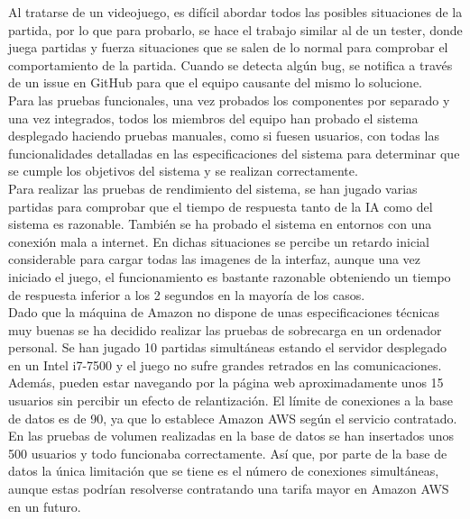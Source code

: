 Al tratarse de un videojuego, es difícil abordar todos las posibles situaciones de la partida, por lo que para probarlo, se hace el trabajo similar al de un tester, donde juega partidas y fuerza situaciones que se salen de lo normal para comprobar el comportamiento de la partida. Cuando se detecta algún bug, se notifica a través de un issue en GitHub para que el equipo causante del mismo lo solucione. \\

Para las pruebas funcionales, una vez probados los componentes por separado y una vez integrados, todos los miembros del equipo han probado el sistema desplegado haciendo pruebas manuales, como si fuesen usuarios, con todas las funcionalidades detalladas en las especificaciones del sistema para determinar que se cumple los objetivos del sistema y se realizan correctamente. \\

Para realizar las pruebas de rendimiento del sistema, se han jugado varias partidas para comprobar que el tiempo de respuesta tanto de la IA como del sistema es razonable. También se ha probado el sistema en entornos con una conexión mala a internet. En dichas situaciones se percibe un retardo inicial considerable para cargar todas las imagenes de la interfaz, aunque una vez iniciado el juego, el funcionamiento es bastante razonable obteniendo un tiempo de respuesta inferior a los 2 segundos en la mayoría de los casos. \\

Dado que la máquina de Amazon no dispone de unas especificaciones técnicas muy buenas se ha decidido realizar las pruebas de sobrecarga en un ordenador personal. Se han jugado 10 partidas simultáneas estando el servidor desplegado en un Intel i7-7500 y el juego no sufre grandes retrados en las comunicaciones. Además, pueden estar navegando por la página web aproximadamente unos 15 usuarios sin percibir un efecto de relantización. El límite de conexiones a la base de datos es de 90, ya que lo establece Amazon AWS según el servicio contratado.\\

En las pruebas de volumen realizadas en la base de datos se han insertados unos 500 usuarios y todo funcionaba correctamente. Así que, por parte de la base de datos la única limitación que se tiene es el número de conexiones simultáneas, aunque estas podrían resolverse contratando una tarifa mayor en Amazon AWS en un futuro. \\

